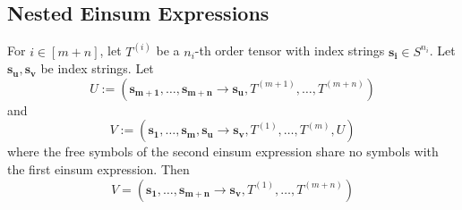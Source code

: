 \subsection{Nested Einsum Expressions}
\begin{theorem}
    \label{thm:nested_einsum:1}
    For $i \in [m + n]$, let $T^{(i)}$ be a $n_i$-th order tensor with index strings $\bm{s_i} \in S^{n_i}$.
    Let $\bm{s_u}, \bm{s_v}$ be index strings.
    Let
    $$U := (\bm{s_{m + 1}},\dots,\bm{s_{m + n}} \rightarrow \bm{s_u}, T^{(m + 1)},\dots,T^{(m + n)})$$
    and
    $$V := (\bm{s_1},\dots,\bm{s_m}, \bm{s_u} \rightarrow \bm{s_v}, T^{(1)},\dots,T^{(m)}, U)$$
    where the free symbols of the second einsum expression share no symbols with the first einsum expression.
    Then
    $$V = (\bm{s_1}, \dots, \bm{s_{m + n}} \rightarrow \bm{s_v}, T^{(1)}, \dots, T^{(m + n)})$$
\end{theorem}
